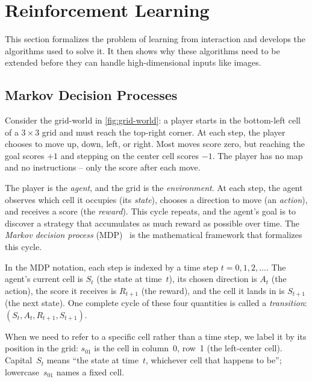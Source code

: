 \section{Reinforcement Learning}
\label{sec:rl-foundations}

This section formalizes the problem of learning from interaction
and develops the algorithms used to solve it. It then shows why
these algorithms need to be extended before they can handle
high-dimensional inputs like images.

\subsection{Markov Decision Processes}
\label{subsec:mdp}

Consider the grid-world in \cref{fig:grid-world}: a player starts
in the bottom-left cell of a $3 \times 3$ grid and must reach the
top-right corner. At each step, the player chooses to move up,
down, left, or right. Most moves score zero, but reaching the goal
scores $+1$ and stepping on the center cell scores $-1$. The player
has no map and no instructions -- only the score after each move.



\smallskip
The player is the \emph{agent}, and the grid is the
\emph{environment}. At each step, the agent observes which cell it
occupies (its \emph{state}), chooses a direction to move (an
\emph{action}), and receives a score (the \emph{reward}). This
cycle repeats, and the agent's goal is to discover a strategy that
accumulates as much reward as possible over time. The \emph{Markov
decision process} (MDP)~\citep{sutton2018reinforcement} is the
mathematical framework that formalizes this cycle.

\smallskip
In the MDP notation, each step is indexed by a time step
$t = 0, 1, 2, \ldots$. The agent's current cell is $S_t$ (the
state at time~$t$), its chosen direction is $A_t$ (the action),
the score it receives is $R_{t+1}$ (the reward), and the cell it
lands in is $S_{t+1}$ (the next state). One complete cycle of these
four quantities is called a \emph{transition}:
$(S_t, A_t, R_{t+1}, S_{t+1})$.

\smallskip
When we need to refer to a specific cell rather than a time step,
we label it by its position in the grid: $s_{01}$ is the cell in
column~0, row~1 (the left-center cell). Capital~$S_t$ means ``the
state at time~$t$, whichever cell that happens to be'';
lowercase~$s_{01}$ names a fixed cell.

